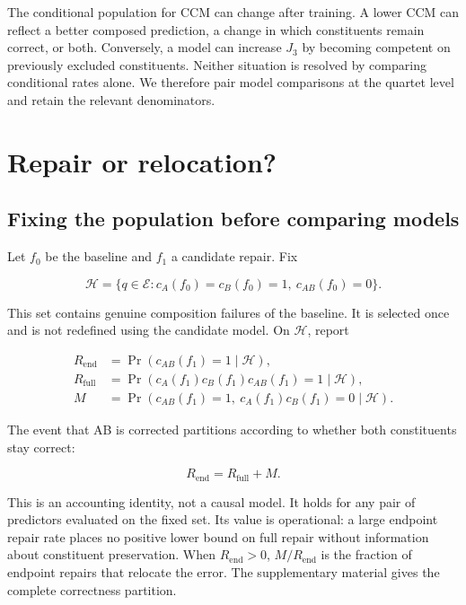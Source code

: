 The conditional population for CCM can change after training. A lower CCM can reflect a better composed prediction, a change in which constituents remain correct, or both. Conversely, a model can increase \(J_3\) by becoming competent on previously excluded constituents. Neither situation is resolved by comparing conditional rates alone. We therefore pair model comparisons at the quartet level and retain the relevant denominators.

\hypertarget{repair-or-relocation}{%
\section{Repair or relocation?}\label{repair-or-relocation}}

\hypertarget{fixing-the-population-before-comparing-models}{%
\subsection{Fixing the population before comparing models}\label{fixing-the-population-before-comparing-models}}

Let \(f_0\) be the baseline and \(f_1\) a candidate repair. Fix

\[
\mathcal H=\{q\in\mathcal E:c_A(f_0)=c_B(f_0)=1,\ c_{AB}(f_0)=0\}.
\]

This set contains genuine composition failures of the baseline. It is selected once and is not redefined using the candidate model. On \(\mathcal H\), report

\[
\begin{aligned}
R_{\mathrm{end}}&=\Pr(c_{AB}(f_1)=1\mid\mathcal H),\\
R_{\mathrm{full}}&=\Pr(c_A(f_1)c_B(f_1)c_{AB}(f_1)=1\mid\mathcal H),\\
M&=\Pr(c_{AB}(f_1)=1,\ c_A(f_1)c_B(f_1)=0\mid\mathcal H).
\end{aligned}
\]

The event that AB is corrected partitions according to whether both constituents stay correct:

\[
\boxed{R_{\mathrm{end}}=R_{\mathrm{full}}+M.}
\]

This is an accounting identity, not a causal model. It holds for any pair of predictors evaluated on the fixed set. Its value is operational: a large endpoint repair rate places no positive lower bound on full repair without information about constituent preservation. When \(R_{\mathrm{end}}>0\), \(M/R_{\mathrm{end}}\) is the fraction of endpoint repairs that relocate the error. The supplementary material gives the complete correctness partition.

